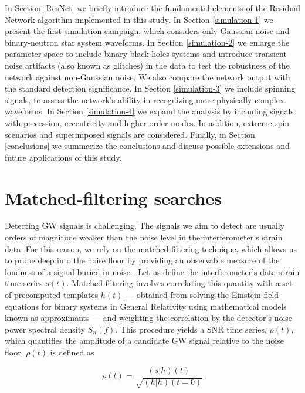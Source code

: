\documentclass[aps,prd,twocolumn,superscriptaddress,nofootinbib, longbibliography]{revtex4-2}
\begin{document}
	In Section \ref{ResNet} we briefly introduce the fundamental elements of the Residual Network algorithm implemented in this study.
	In Section \ref{simulation-1} we present the first simulation campaign, which considers only Gaussian noise and binary-neutron star system waveforms.
	In Section \ref{simulation-2} we enlarge the parameter space to include binary-black holes systems and introduce transient noise artifacts (also known as glitches) in the data to test the robustness of the network against non-Gaussian noise. We also compare the network output with the standard detection significance.
	In Section \ref{simulation-3} we include spinning signals, to assess the network's ability in recognizing more physically complex waveforms. 
	In Section \ref{simulation-4} we expand the analysis by including signals with precession, eccentricity and higher-order modes. In addition, extreme-spin scenarios and superimposed signals are considered.
	Finally, in Section \ref{conclusions} we summarize the conclusions and discuss possible extensions and future applications of this study.


\section{Matched-filtering searches}\label{matched-filtering-searches}

	Detecting GW signals is challenging. The signals we aim to detect are usually orders of magnitude weaker than the noise level in the interferometer's strain data. For this reason, we rely on the matched-filtering technique, which allows us to probe deep into the noise floor by providing an observable measure of the loudness of a signal buried in noise \cite{matched_filtering}.
	Let us define the interferometer's data strain time series $s(t)$. Matched-filtering involves correlating this quantity with a set of precomputed templates $h(t)$ --- obtained from solving the Einstein field equations for binary systems in General Relativity using mathematical models known as approximants --- and weighting the correlation by the detector's noise power spectral density $S_n(f)$. This procedure yields a SNR time series, $\rho(t)$, which quantifies the amplitude of a candidate GW signal relative to the noise floor. $\rho(t)$ is defined as
	
\begin{equation}
	\rho(t) = \frac{(s|h)(t)}{\sqrt{(h|h)(t=0)}}
	\label{eq:SNR}
\end{equation}
	
\end{document}
